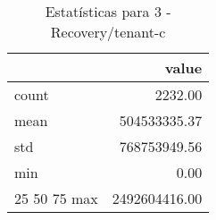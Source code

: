 \begin{table}[htbp]
\caption{Estatísticas para 3 - Recovery/tenant-c}
\label{tab:3_-_recovery_tenant-c_summary}
\begin{tabular}{lr}
\toprule
 & value \\
\midrule
count & 2232.00 \\
mean & 504533335.37 \\
std & 768753949.56 \\
min & 0.00 \\
25%
50%
75%
max & 2492604416.00 \\
\bottomrule
\end{tabular}
\end{table}

